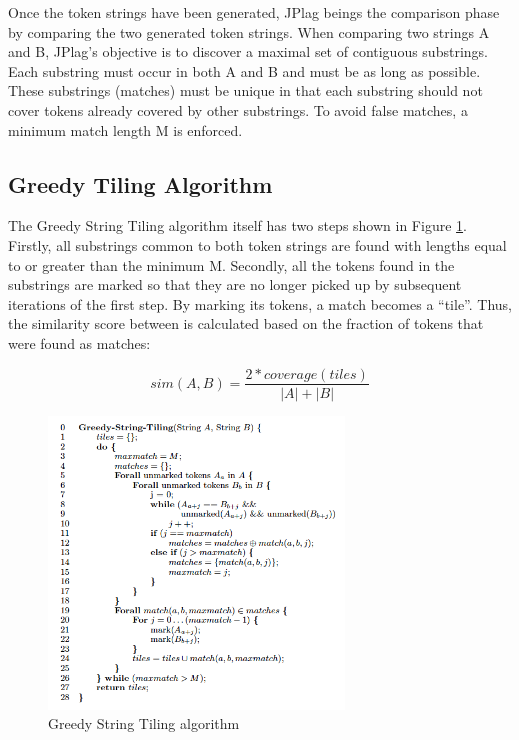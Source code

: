 Once the token strings have been generated, JPlag beings the comparison phase by comparing the two generated token strings. When comparing two strings A and B, JPlag’s objective is to discover a maximal set of contiguous substrings. Each substring must occur in both A and B and must be as long as possible. These substrings (matches) must be unique in that each substring should not cover tokens already covered by other substrings. To avoid false matches, a minimum match length M is enforced. 

\subsection{Greedy Tiling Algorithm}
The Greedy String Tiling algorithm itself has two steps shown in Figure \ref{fig:greedy}. Firstly, all substrings common to both token strings are found with lengths equal to or greater than the minimum M. Secondly, all the tokens found in the substrings are marked so that they are no longer picked up by subsequent iterations of the first step. By marking its tokens, a match becomes a “tile”. Thus, the similarity score between is calculated based on the fraction of tokens that were found as matches:

\begin{equation}
    sim(A,B) = \frac{2 * coverage(tiles)}{|A|+|B|}
\end{equation}
\begin{figure} [ht]
\centering
\includegraphics[width=0.7\textwidth]{Figures/stringtiling}
\caption{Greedy String Tiling algorithm}
\label{fig:greedy}
\end{figure}

\break